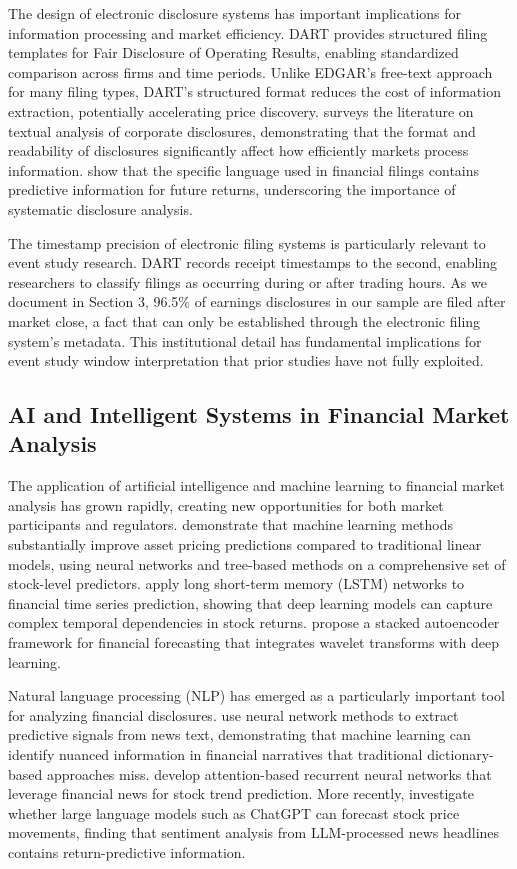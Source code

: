 \documentclass[manuscript,review]{acmart}
\begin{document}
The design of electronic disclosure systems has important implications for information processing and market efficiency. DART provides structured filing templates for Fair Disclosure of Operating Results, enabling standardized comparison across firms and time periods. Unlike EDGAR's free-text approach for many filing types, DART's structured format reduces the cost of information extraction, potentially accelerating price discovery. \citet{li2010textual} surveys the literature on textual analysis of corporate disclosures, demonstrating that the format and readability of disclosures significantly affect how efficiently markets process information. \citet{loughran2011liability} show that the specific language used in financial filings contains predictive information for future returns, underscoring the importance of systematic disclosure analysis.

The timestamp precision of electronic filing systems is particularly relevant to event study research. DART records receipt timestamps to the second, enabling researchers to classify filings as occurring during or after trading hours. As we document in Section 3, 96.5\% of earnings disclosures in our sample are filed after market close, a fact that can only be established through the electronic filing system's metadata. This institutional detail has fundamental implications for event study window interpretation that prior studies have not fully exploited.

\subsection{AI and Intelligent Systems in Financial Market Analysis}

The application of artificial intelligence and machine learning to financial market analysis has grown rapidly, creating new opportunities for both market participants and regulators. \citet{gu2020empirical} demonstrate that machine learning methods substantially improve asset pricing predictions compared to traditional linear models, using neural networks and tree-based methods on a comprehensive set of stock-level predictors. \citet{fischer2018deep} apply long short-term memory (LSTM) networks to financial time series prediction, showing that deep learning models can capture complex temporal dependencies in stock returns. \citet{bao2017deep} propose a stacked autoencoder framework for financial forecasting that integrates wavelet transforms with deep learning.

Natural language processing (NLP) has emerged as a particularly important tool for analyzing financial disclosures. \citet{ke2020predicting} use neural network methods to extract predictive signals from news text, demonstrating that machine learning can identify nuanced information in financial narratives that traditional dictionary-based approaches miss. \citet{dong2020leveraging} develop attention-based recurrent neural networks that leverage financial news for stock trend prediction. More recently, \citet{lopez2023can} investigate whether large language models such as ChatGPT can forecast stock price movements, finding that sentiment analysis from LLM-processed news headlines contains return-predictive information.
\end{document}
